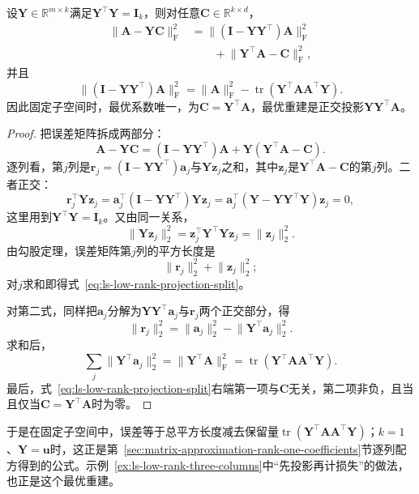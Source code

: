 \begin{lemma}[固定子空间时的正交误差分解]
\label{lem:ls-low-rank-projection-error}
设$\bm Y\in\mathbb R^{m\times k}$满足$\bm Y^\top\bm Y=\bm I_k$，则对任意$\bm C\in\mathbb R^{k\times d}$，
\begin{equation}
 \begin{aligned}
 \lVert\bm A-\bm Y\bm C\rVert_{\mathrm F}^2
 &=\lVert(\bm I-\bm Y\bm Y^\top)\bm A\rVert_{\mathrm F}^2\\
 &\qquad+\lVert\bm Y^\top\bm A-\bm C\rVert_{\mathrm F}^2,
 \end{aligned}
 \label{eq:ls-low-rank-projection-split}
\end{equation}
并且
\begin{equation}
 \lVert(\bm I-\bm Y\bm Y^\top)\bm A\rVert_{\mathrm F}^2
 =\lVert\bm A\rVert_{\mathrm F}^2-\operatorname{tr}(\bm Y^\top\bm A\bm A^\top\bm Y).
 \label{eq:ls-low-rank-projection-residual}
\end{equation}
因此固定子空间时，最优系数唯一，为$\bm C=\bm Y^\top\bm A$，最优重建是正交投影$\bm Y\bm Y^\top\bm A$。
\end{lemma}
\begin{proof}
把误差矩阵拆成两部分：
\[
 \bm A-\bm Y\bm C=(\bm I-\bm Y\bm Y^\top)\bm A+\bm Y(\bm Y^\top\bm A-\bm C).
\]
逐列看，第$j$列是$\bm r_j=(\bm I-\bm Y\bm Y^\top)\bm a_j$与$\bm Y\bm z_j$之和，其中$\bm z_j$是$\bm Y^\top\bm A-\bm C$的第$j$列。二者正交：
\[
 \bm r_j^\top\bm Y\bm z_j=\bm a_j^\top(\bm I-\bm Y\bm Y^\top)\bm Y\bm z_j
 =\bm a_j^\top(\bm Y-\bm Y\bm Y^\top\bm Y)\bm z_j=0 ,
\]
这里用到$\bm Y^\top\bm Y=\bm I_k$。又由同一关系，
\[
 \lVert\bm Y\bm z_j\rVert_2^2=\bm z_j^\top\bm Y^\top\bm Y\bm z_j=\lVert\bm z_j\rVert_2^2 .
\]
由勾股定理，误差矩阵第$j$列的平方长度是
\[
 \lVert\bm r_j\rVert_2^2+\lVert\bm z_j\rVert_2^2 ;
\]
对$j$求和即得式~\eqref{eq:ls-low-rank-projection-split}。

对第二式，同样把$\bm a_j$分解为$\bm Y\bm Y^\top\bm a_j$与$\bm r_j$两个正交部分，得
\[
 \lVert\bm r_j\rVert_2^2=\lVert\bm a_j\rVert_2^2-\lVert\bm Y^\top\bm a_j\rVert_2^2 .
\]
求和后，
\[
 \sum_j\lVert\bm Y^\top\bm a_j\rVert_2^2=\lVert\bm Y^\top\bm A\rVert_{\mathrm F}^2
 =\operatorname{tr}(\bm Y^\top\bm A\bm A^\top\bm Y).
\]
最后，式~\eqref{eq:ls-low-rank-projection-split}右端第一项与$\bm C$无关，第二项非负，且当且仅当$\bm C=\bm Y^\top\bm A$时为零。
\end{proof}

于是在固定子空间中，误差等于总平方长度减去保留量$\operatorname{tr}(\bm Y^\top\bm A\bm A^\top\bm Y)$；$k=1$、$\bm Y=\bm u$时，这正是第~\ref{sec:matrix-approximation-rank-one-coefficients}节逐列配方得到的公式。示例~\ref{ex:ls-low-rank-three-columns}中“先投影再计损失”的做法，也正是这个最优重建。

